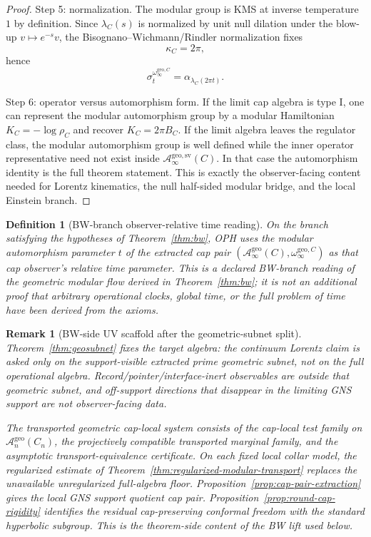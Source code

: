\documentclass[11pt]{article}
\newtheorem{definition}[theorem]{Definition}
\newtheorem{remark}[theorem]{Remark}
\begin{document}
\begin{proof}
Step 5: normalization. The modular group is KMS at inverse temperature \(1\) by definition. Since \(\lambda_C(s)\) is normalized by unit null dilation under the blow-up \(v\mapsto e^{-s}v\), the Bisognano--Wichmann/Rindler normalization fixes
\[
\kappa_C=2\pi,
\]
hence
\[
\sigma_t^{\omega_\infty^{\mathrm{geo},C}}
=
\alpha_{\lambda_C(2\pi t)}.
\]

Step 6: operator versus automorphism form. If the limit cap algebra is type I, one can represent the modular automorphism group by a modular Hamiltonian \(K_C=-\log\rho_C\) and recover \(K_C=2\pi B_C\). If the limit algebra leaves the regulator class, the modular automorphism group is well defined while the inner operator representative need not exist inside \(\mathcal A_\infty^{\mathrm{geo,sv}}(C)\). In that case the automorphism identity is the full theorem statement. This is exactly the observer-facing content needed for Lorentz kinematics, the null half-sided modular bridge, and the local Einstein branch.
\end{proof}

\begin{definition}[BW-branch observer-relative time reading]\label{def:modulartime}
On the branch satisfying the hypotheses of Theorem~\ref{thm:bw}, OPH uses the modular
automorphism parameter \(t\) of the extracted cap pair
\((\mathcal A_\infty^{\mathrm{geo}}(C),\omega_\infty^{\mathrm{geo},C})\) as that cap
observer's relative time parameter. This is a declared BW-branch reading of the geometric
modular flow derived in Theorem~\ref{thm:bw}; it is not an additional proof that arbitrary
operational clocks, global time, or the full problem of time have been derived from the axioms.
\end{definition}

\begin{remark}[BW-side UV scaffold after the geometric-subnet split]
Theorem~\ref{thm:geosubnet} fixes the target algebra: the continuum Lorentz claim is asked only on the support-visible extracted prime geometric subnet, not on the full operational algebra. Record/pointer/interface-inert observables are outside that geometric subnet, and off-support directions that disappear in the limiting GNS support are not observer-facing data.

The transported geometric cap-local system consists of the cap-local test family on \(\mathcal A_n^{\mathrm{geo}}(C_n)\), the projectively compatible transported marginal family, and the asymptotic transport-equivalence certificate. On each fixed local collar model, the regularized estimate of Theorem~\ref{thm:regularized-modular-transport} replaces the unavailable unregularized full-algebra floor. Proposition~\ref{prop:cap-pair-extraction} gives the local GNS support quotient cap pair. Proposition~\ref{prop:round-cap-rigidity} identifies the residual cap-preserving conformal freedom with the standard hyperbolic subgroup. This is the theorem-side content of the BW lift used below.
\end{remark}
\end{document}
